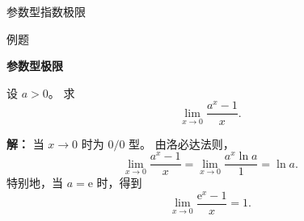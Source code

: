 \documentclass[aspectratio=169,10pt,fontset=fandol]{ctexbeamer}
\newcommand{\ee}{\mathrm{e}}
\begin{document}
\begin{frame}[t,fragile]{参数型指数极限}
\normalsize
\begin{block}{例题}
{\normalsize
\textbf{参数型极限}\par

设 $a>0$。 求
\[
\lim_{x\to0}\frac{a^x-1}{x}.
\]

}
\end{block}
\pause
{\normalsize
\textbf{解：}
当 $x\to0$ 时为 $0/0$ 型。 由洛必达法则，
\[
\lim_{x\to0}\frac{a^x-1}{x}
=\lim_{x\to0}\frac{a^x\ln a}{1}
=\ln a.
\]
特别地，当 $a=\ee$ 时，得到
\[
\lim_{x\to0}\frac{\ee^x-1}{x}=1.
\]

}
\end{frame}
\end{document}
